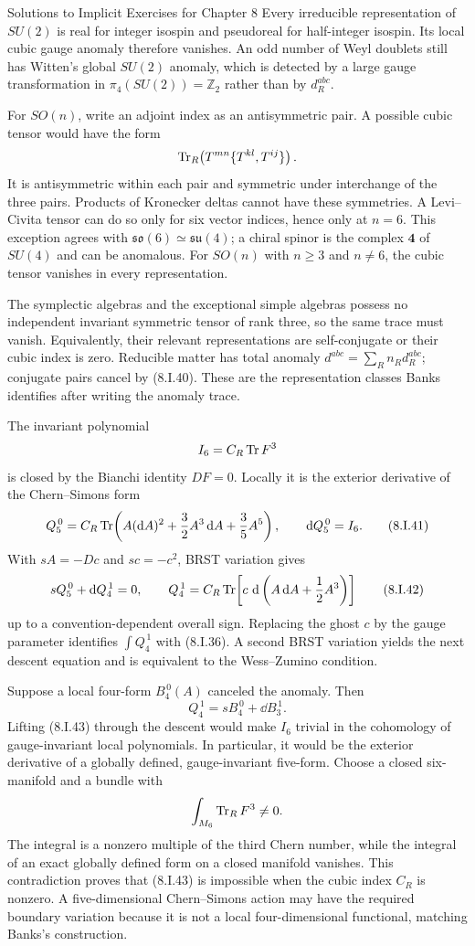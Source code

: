 \begin{bankssolutions}{Solutions to Implicit Exercises for Chapter 8}
Every irreducible representation of $SU(2)$ is real for integer isospin and
pseudoreal for half-integer isospin.  Its local cubic gauge anomaly therefore
vanishes.  An odd number of Weyl doublets still has Witten's global $SU(2)$
anomaly, which is detected by a large gauge transformation in
$\pi_4(SU(2))=\mathbb Z_2$ rather than by $d_R^{abc}$.

For $SO(n)$, write an adjoint index as an antisymmetric pair.  A possible
cubic tensor would have the form
\[
 \operatorname{Tr}_R\!\left(T^{mn}\{T^{kl},T^{ij}\}\right).
\]
It is antisymmetric within each pair and symmetric under interchange of the
three pairs.  Products of Kronecker deltas cannot have these symmetries.  A
Levi--Civita tensor can do so only for six vector indices, hence only at
$n=6$.  This exception agrees with
$\mathfrak{so}(6)\simeq\mathfrak{su}(4)$; a chiral spinor is the complex
$\mathbf4$ of $SU(4)$ and can be anomalous.  For $SO(n)$ with $n\ge3$ and
$n\ne6$, the cubic tensor vanishes in every representation.

The symplectic algebras and the exceptional simple algebras possess no
independent invariant symmetric tensor of rank three, so the same trace must
vanish.  Equivalently, their relevant representations are self-conjugate or
their cubic index is zero.  Reducible matter has total anomaly
$d^{abc}=\sum_Rn_Rd_R^{abc}$; conjugate pairs cancel by (8.I.40).  These are
the representation classes Banks identifies after writing the anomaly trace.

The invariant polynomial
\[
 I_6=C_R\operatorname{Tr} F^3
\]
is closed by the Bianchi identity $DF=0$.  Locally it is the exterior
derivative of the Chern--Simons form
\[
 Q_5^{\,0}=C_R\operatorname{Tr}\!\left(
 A(\mathop{}\!\mathrm{d} A)^2+\frac32A^3\mathop{}\!\mathrm{d} A+\frac35A^5\right),
 \qquad \mathop{}\!\mathrm{d} Q_5^{\,0}=I_6. \tag{8.I.41}
\]
With $sA=-Dc$ and $sc=-c^2$, BRST variation gives
\[
 sQ_5^{\,0}+\mathop{}\!\mathrm{d} Q_4^{\,1}=0,
 \qquad
 Q_4^{\,1}=C_R\operatorname{Tr}\!\left[c\,\mathop{}\!\mathrm{d}
 \left(A\mathop{}\!\mathrm{d} A+\frac12A^3\right)\right] \tag{8.I.42}
\]
up to a convention-dependent overall sign.  Replacing the ghost $c$ by the
gauge parameter identifies $\int Q_4^{\,1}$ with (8.I.36).  A second BRST
variation yields the next descent equation and is equivalent to the
Wess--Zumino condition.

Suppose a local four-form $B_4^{\,0}(A)$ canceled the anomaly.  Then
\[
 Q_4^{\,1}=sB_4^{\,0}+\dd B_3^{\,1}. \tag{8.I.43}
\]
Lifting (8.I.43) through the descent would make $I_6$ trivial in the
cohomology of gauge-invariant local polynomials.  In particular, it would be
the exterior derivative of a globally defined, gauge-invariant five-form.
Choose a closed six-manifold and a bundle with
\[
 \int_{M_6}\operatorname{Tr}_R F^3\ne0.
\]
The integral is a nonzero multiple of the third Chern number, while the
integral of an exact globally defined form on a closed manifold vanishes.
This contradiction proves that (8.I.43) is impossible when the cubic index
$C_R$ is nonzero.  A five-dimensional Chern--Simons action may have the
required boundary variation because it is not a local four-dimensional
functional, matching Banks's construction.


\end{bankssolutions}
